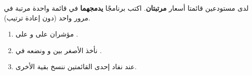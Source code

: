\begin{statement}
لدى مستودعين قائمتا أسعار \textbf{مرتبتان}. اكتب برنامجًا \textbf{يدمجهما} في قائمة واحدة مرتبة في مرور واحد (دون إعادة ترتيب).
\end{statement}
\begin{stepsbox}\begin{enumerate}
\item مؤشران  على  و على .
\item نأخذ الأصغر بين  و ونضعه في .
\item عند نفاد إحدى القائمتين ننسخ بقية الأخرى.
\end{enumerate}\end{stepsbox}
